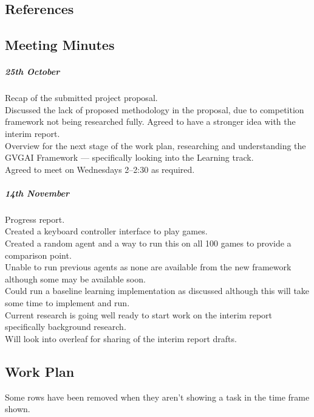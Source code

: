 \documentclass[a4paper]{article}
\begin{document}
\subsection{References}
\renewcommand\refname{\vspace{-1cm}}



\subsection{Meeting Minutes}
\subparagraph{25th October}
Recap of the submitted project proposal. \\
Discussed the lack of proposed methodology in the proposal, due to competition framework not being researched fully. Agreed to have a stronger idea with the interim report. \\
Overview for the next stage of the work plan, researching and understanding the GVGAI Framework --- specifically looking into the Learning track. \\
Agreed to meet on Wednesdays 2--2:30 as required.

\subparagraph{14th November}
Progress report. \\
Created a keyboard controller interface to play games. \\
Created a random agent and a way to run this on all 100 games to provide a comparison point. \\
Unable to run previous agents as none are available from the new framework although some may be available soon. \\
Could run a baseline learning implementation as discussed although this will take some time to implement and run. \\
Current research is going well ready to start work on the interim report specifically background research. \\
Will look into overleaf for sharing of the interim report drafts.

\pagebreak
\subsection{Work Plan}
Some rows have been removed when they aren't showing a task in the time frame shown.
\end{document}
